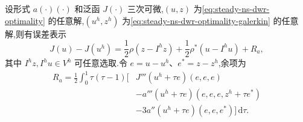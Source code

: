 \begin{theorem}[误差表示]\label{thm:steady-ns-dwr-error-representation}
设形式 $a(\cdot)(\cdot)$ 和泛函 $J(\cdot)$ 三次可微,$(u,z)$ 为\cref{eq:steady-ns-dwr-optimality} 的任意解,$(u^h,z^h)$ 为\cref{eq:steady-ns-dwr-optimality-galerkin} 的任意解,则有误差表示
\begin{equation}\label{eq:steady-ns-dwr-error-representation}
  J(u)-J(u^h)
  =\frac12\rho(z-I^h z)+\frac12\rho^*(u-I^h u)+R_a,
\end{equation}
其中 $I^h z,I^h u\in V^h$ 可任意选取.令 $e=u-u^h$、$e^*=z-z^h$,余项为
\[
\begin{aligned}
  R_a=\frac12\int_0^1\tau(\tau-1)\Big[{}
    &J'''(u^h+\tau e)(e,e,e)\\
    &-a'''(u^h+\tau e)(e,e,e,z^h+\tau e^*)\\
    &-3a''(u^h+\tau e)(e,e,e^*)
  \Big] \,\mathrm{d}\tau.
\end{aligned}
\]
\end{theorem}

